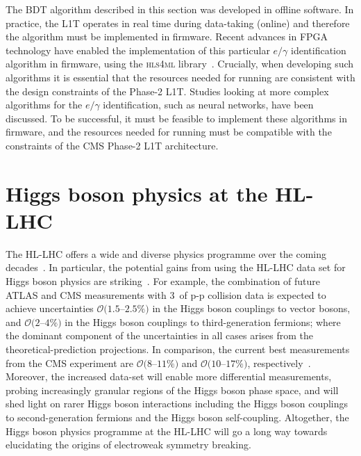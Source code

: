 The BDT algorithm described in this section was developed in offline software. In practice, the L1T operates in real time during data-taking (online) and therefore the algorithm must be implemented in firmware. Recent advances in FPGA technology have enabled the implementation of this particular $e/\gamma$ identification algorithm in firmware, using the \textsc{hls4ml} library~\cite{Duarte_2018}. Crucially, when developing such algorithms it is essential that the resources needed for running are consistent with the design constraints of the Phase-2 L1T. Studies looking at more complex algorithms for the $e/\gamma$ identification, such as neural networks, have been discussed. To be successful, it must be feasible to implement these algorithms in firmware, and the resources needed for running must be compatible with the constraints of the CMS Phase-2 L1T architecture.

\section{Higgs boson physics at the HL-LHC}\label{sec:trilinear}
The HL-LHC offers a wide and diverse physics programme over the coming decades~\cite{Atlas:2019qfx,Bediaga:2018lhg}. In particular, the potential gains from using the HL-LHC data set for Higgs boson physics are striking~\cite{Cepeda:2019klc}. For example, the combination of future ATLAS and CMS measurements with 3~\abinv of p-p collision data is expected to achieve uncertainties $\mathcal{O}(1.5$--$2.5\%)$ in the Higgs boson couplings to vector bosons, and $\mathcal{O}(2$--$4\%)$ in the Higgs boson couplings to third-generation fermions; where the dominant component of the uncertainties in all cases arises from the theoretical-prediction projections. In comparison, the current best measurements from the CMS experiment are $\mathcal{O}(8$--$11\%)$ and $\mathcal{O}(10$--$17\%)$, respectively~\cite{Sirunyan:2020two}. Moreover, the increased data-set will enable more differential measurements, probing increasingly granular regions of the Higgs boson phase space, and will shed light on rarer Higgs boson interactions including the Higgs boson couplings to second-generation fermions and the Higgs boson self-coupling. Altogether, the Higgs boson physics programme at the HL-LHC will go a long way towards elucidating the origins of electroweak symmetry breaking.

